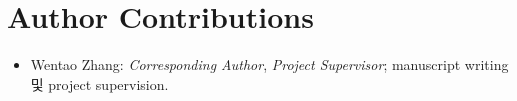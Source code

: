 \section{Author Contributions}


\newcommand{\ProjectLeader}{\textcolor{red!70!black}{\textit{Project Leader}}}
\newcommand{\ProjectFounder}{\textcolor{blue!70!black}{\textit{Project Founder}}}
\newcommand{\CoreContributor}{\textcolor{green!50!black}{\textit{Core Contributor}}}
\newcommand{\Contributor}{\textcolor{green!80!black}{\textit{Contributor}}}
\newcommand{\ProjectSupervisor}{\textcolor{purple!70!black}{\textit{Project Supervisor}}}
\newcommand{\CorrespondingAuthor}{\textcolor{orange!80!black}{\textit{Corresponding Author}}}



\begin{itemize}
    \item Wentao Zhang: \CorrespondingAuthor, \ProjectSupervisor; manuscript writing 및 project supervision.
\end{itemize}
